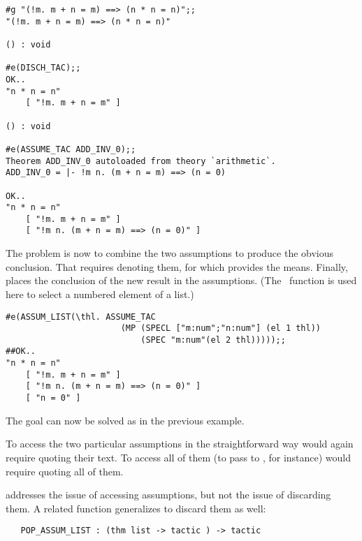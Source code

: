 {\setcounter{sessioncount}{1}
\begin{session}\begin{verbatim}
#g "(!m. m + n = m) ==> (n * n = n)";;
"(!m. m + n = m) ==> (n * n = n)"

() : void

#e(DISCH_TAC);;
OK..
"n * n = n"
    [ "!m. m + n = m" ]

() : void

#e(ASSUME_TAC ADD_INV_0);;
Theorem ADD_INV_0 autoloaded from theory `arithmetic`.
ADD_INV_0 = |- !m n. (m + n = m) ==> (n = 0)

OK..
"n * n = n"
    [ "!m. m + n = m" ]
    [ "!m n. (m + n = m) ==> (n = 0)" ]
\end{verbatim}\end{session}

\noindent The problem is now to combine the two assumptions to produce the
obvious conclusion. That requires denoting
 them, for which  
provides the means. Finally,
 places the conclusion of the new result in the assumptions.
(The \ML\ function  is used here to select a
numbered element of a list.)

\begin{session}\begin{verbatim}
#e(ASSUM_LIST(\thl. ASSUME_TAC
                       (MP (SPECL ["m:num";"n:num"] (el 1 thl)) 
                           (SPEC "m:num"(el 2 thl)))));;
##OK..
"n * n = n"
    [ "!m. m + n = m" ]
    [ "!m n. (m + n = m) ==> (n = 0)" ]
    [ "n = 0" ]
\end{verbatim}\end{session}

\noindent The goal can now be solved as in the previous example. 

To access the
two particular assumptions in the straightforward way would again require quoting
their text. To access all of them (to pass to , for
instance) would require quoting all of them.

 addresses the issue of accessing assumptions,
but not the issue of discarding them.  A related function generalizes
 to discard them as well:

\begin{hol}\begin{verbatim}
   POP_ASSUM_LIST : (thm list -> tactic ) -> tactic
\end{verbatim}\end{hol}

}
